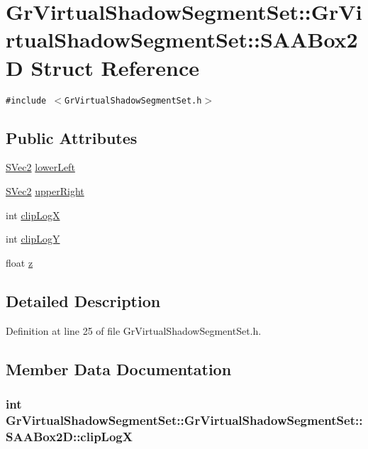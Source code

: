 \hypertarget{struct_gr_virtual_shadow_segment_set_1_1_s_a_a_box2_d}{
\section{GrVirtualShadowSegmentSet::GrVirtualShadowSegmentSet::SAABox2D Struct Reference}
\label{struct_gr_virtual_shadow_segment_set_1_1_s_a_a_box2_d}
}
{\tt \#include $<$GrVirtualShadowSegmentSet.h$>$}

\subsection*{Public Attributes}
\begin{CompactItemize}
\item 
\hyperlink{struct_s_vec2}{SVec2} \hyperlink{struct_gr_virtual_shadow_segment_set_1_1_s_a_a_box2_d_259b18af6ce1cab1c4e3fb74efdd40e3}{lowerLeft}
\item 
\hyperlink{struct_s_vec2}{SVec2} \hyperlink{struct_gr_virtual_shadow_segment_set_1_1_s_a_a_box2_d_575507ef6de5554d267e9295adb7fe0d}{upperRight}
\item 
int \hyperlink{struct_gr_virtual_shadow_segment_set_1_1_s_a_a_box2_d_682722402a3e4f1a78207e21b6ad167d}{clipLogX}
\item 
int \hyperlink{struct_gr_virtual_shadow_segment_set_1_1_s_a_a_box2_d_1479933b4896c9b6e86c4d54d2c02e57}{clipLogY}
\item 
float \hyperlink{struct_gr_virtual_shadow_segment_set_1_1_s_a_a_box2_d_910f8b178fd97b53732a64c410323f74}{z}
\end{CompactItemize}


\subsection{Detailed Description}


Definition at line 25 of file GrVirtualShadowSegmentSet.h.

\subsection{Member Data Documentation}
\hypertarget{struct_gr_virtual_shadow_segment_set_1_1_s_a_a_box2_d_682722402a3e4f1a78207e21b6ad167d}{
\subsubsection[{clipLogX}]{\setlength{\rightskip}{0pt plus 5cm}int GrVirtualShadowSegmentSet::GrVirtualShadowSegmentSet::SAABox2D::clipLogX}}
\label{struct_gr_virtual_shadow_segment_set_1_1_s_a_a_box2_d_682722402a3e4f1a78207e21b6ad167d}




